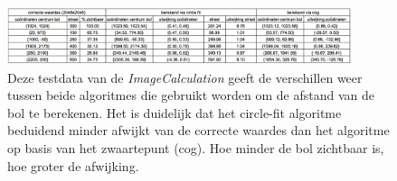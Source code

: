 \begin{figure}[h]
	\centering
	\includegraphics[width=0.9\textwidth]{TestData.png}
	\caption{Deze testdata van de \textit{ImageCalculation} geeft de verschillen weer tussen beide algoritmes die gebruikt worden om de afstand van de bol te berekenen. Het is duidelijk dat het circle-fit algoritme beduidend minder afwijkt van de correcte waardes dan het algoritme op basis van het zwaartepunt (cog). Hoe minder de bol zichtbaar is, hoe groter de afwijking.}
\end{figure}